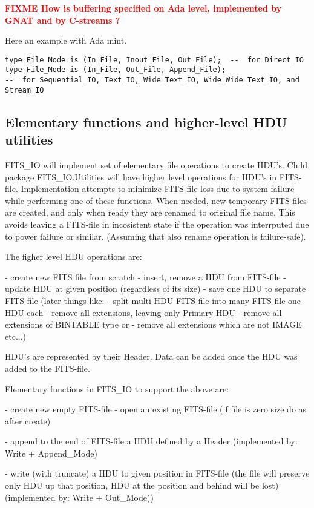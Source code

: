 \documentclass[a4paper,10pt]{article}
\newcommand{\fixme}[1]{\textbf{\textcolor{red}{FIXME #1}}}
\begin{document}
\fixme{How is buffering specified on Ada level, implemented by GNAT and by C-streams ?}

Here an example with Ada mint. 
\begin{verbatim}
type File_Mode is (In_File, Inout_File, Out_File);  --  for Direct_IO
type File_Mode is (In_File, Out_File, Append_File);
--  for Sequential_IO, Text_IO, Wide_Text_IO, Wide_Wide_Text_IO, and Stream_IO
\end{verbatim} 

\subsection{Elementary functions and higher-level HDU utilities}
\label{sec:elemntaryfuncs}

FITS\_IO will implement set of elementary file operations to 
create HDU's. Child package FITS\_IO.Utilities will have higher level
operations for HDU's in FITS-file. Implementation attempts to minimize
FITS-file loss due to system failure 
while performing one of these functions.
When needed, new temporary FITS-files are created, 
and only when ready they are renamed to original file name. 
This avoids leaving a FITS-file in incosistent state
if the operation was interrputed due to power failure or similar.
(Assuming that also rename operation is failure-safe).

The figher level HDU operations are:

- create new FITS file from scratch
- insert, remove a HDU from FITS-file
- update HDU at given position (regardless of its size)
- save one HDU to separate FITS-file
(later things like: 
- split multi-HDU FITS-file into many FITS-file one HDU each
- remove all extensions, leaving only Primary HDU
- remove all extensions of BINTABLE type or 
- remove all extensions which are not IMAGE etc...)

HDU's are represented by their Header. 
Data can be added once the HDU
was added to the FITS-file.

Elementary functions in FITS\_IO to support the above are:

- create new empty FITS-file
- open an existing FITS-file 
(if file is zero size do as after create)

- append to the end of FITS-file a HDU defined by a Header
(implemented by: Write + Append_Mode)

- write (with truncate) a HDU to given position in 
FITS-file (the file will preserve only HDU up that position, HDU 
at the position and behind will be lost)
(implemented by: Write + Out_Mode))
\end{document}
